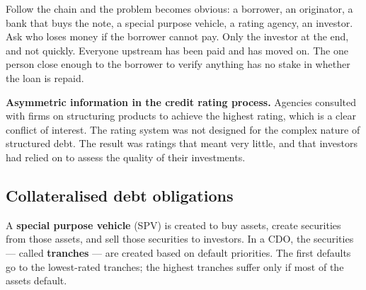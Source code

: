 \documentclass[11pt,a4paper]{article}
\begin{document}
Follow the chain and the problem becomes obvious: a borrower, an originator, a
bank that buys the note, a special purpose vehicle, a rating agency, an
investor. Ask who loses money if the borrower cannot pay. Only the investor at
the end, and not quickly. Everyone upstream has been paid and has moved on. The
one person close enough to the borrower to verify anything has no stake in
whether the loan is repaid.

\textbf{Asymmetric information in the credit rating process.} Agencies consulted
with firms on structuring products to achieve the highest rating, which is a
clear conflict of interest. The rating system was not designed for the complex
nature of structured debt. The result was ratings that meant very little, and
that investors had relied on to assess the quality of their investments.

\subsection*{Collateralised debt obligations}

A \textbf{special purpose vehicle} (SPV) is created to buy assets, create
securities from those assets, and sell those securities to investors. In a CDO,
the securities --- called \textbf{tranches} --- are created based on default
priorities. The first defaults go to the lowest-rated tranches; the highest
tranches suffer only if most of the assets default.

\begin{center}
\end{center}
\end{document}
